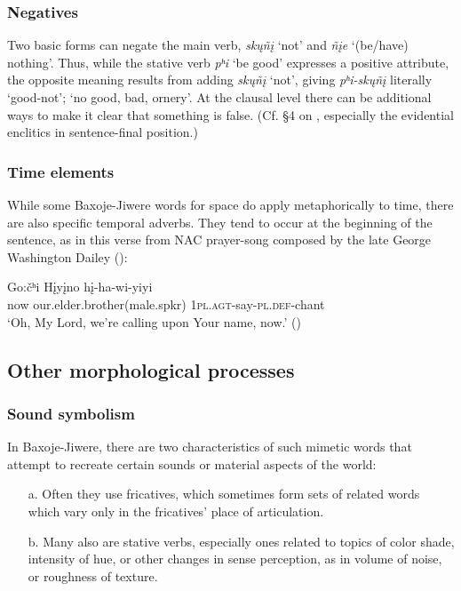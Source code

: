 \documentclass[output=paper]{LSP/langsci}
\begin{document}
\subsubsection{Negatives} 

 Two basic forms can negate the main verb, \textit{sk\k{u}ñ\k{i}} `not' and \textit{ñ\k{i}e} `(be/have) nothing'.  Thus, while the stative verb \textit{pʰi} `be good' expresses a positive attribute, the opposite meaning results from adding \textit{sk\k{u}ñ\k{i}} `not', giving \textit{pʰi-sk\k{u}ñ\k{i}}  literally `good-not'; `no good, bad, ornery'.  At the clausal level there can be additional ways to make it clear that something is false.  (Cf. \S4 on , especially the evidential enclitics in sentence-final position.)  

\subsubsection{Time elements}  
While some Baxoje-Jiwere words for space do apply metaphorically to time, there are also specific temporal adverbs.  They tend to occur at the beginning of the sentence, as in this verse from NAC prayer-song composed by the late George Washington Dailey ():

\ea \gll Go:\v{c}ʰi   H\k{i}y\k{i}no    h\k{i}-ha-wi-yiyi \\
now     our.elder.brother(male.spkr) \textsc{1pl.agt}-say-\textsc{pl.def}-chant	\\
\glt `Oh, My Lord, we're calling upon Your name, now.'	(\citealt{Davidson1997})
\z

\subsection{Other morphological processes}

\subsubsection{Sound symbolism}  

In Baxoje-Jiwere, there are two characteristics of such mimetic words that attempt to recreate certain sounds or material aspects of the world:   

\begin{itemize}
\item[a.] Often they use fricatives,  which sometimes form sets of related words which vary only in the fricatives' place of articulation.   
\item[b.] Many also are stative verbs, especially ones related to topics of color shade, intensity of hue, or other changes in sense perception, as in volume of noise, or roughness of texture. 
\end{itemize}
\end{document}

